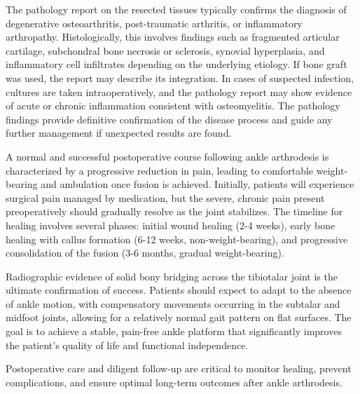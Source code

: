 The pathology report on the resected tissues typically confirms the diagnosis of degenerative osteoarthritis, post-traumatic arthritis, or inflammatory arthropathy. Histologically, this involves findings such as fragmented articular cartilage, subchondral bone necrosis or sclerosis, synovial hyperplasia, and inflammatory cell infiltrates depending on the underlying etiology. If bone graft was used, the report may describe its integration. In cases of suspected infection, cultures are taken intraoperatively, and the pathology report may show evidence of acute or chronic inflammation consistent with osteomyelitis. The pathology findings provide definitive confirmation of the disease process and guide any further management if unexpected results are found.

A normal and successful postoperative course following ankle arthrodesis is characterized by a progressive reduction in pain, leading to comfortable weight-bearing and ambulation once fusion is achieved. Initially, patients will experience surgical pain managed by medication, but the severe, chronic pain present preoperatively should gradually resolve as the joint stabilizes. The timeline for healing involves several phases: initial wound healing (2-4 weeks), early bone healing with callus formation (6-12 weeks, non-weight-bearing), and progressive consolidation of the fusion (3-6 months, gradual weight-bearing). 

Radiographic evidence of solid bony bridging across the tibiotalar joint is the ultimate confirmation of success. Patients should expect to adapt to the absence of ankle motion, with compensatory movements occurring in the subtalar and midfoot joints, allowing for a relatively normal gait pattern on flat surfaces. The goal is to achieve a stable, pain-free ankle platform that significantly improves the patient's quality of life and functional independence.

Postoperative care and diligent follow-up are critical to monitor healing, prevent complications, and ensure optimal long-term outcomes after ankle arthrodesis.

